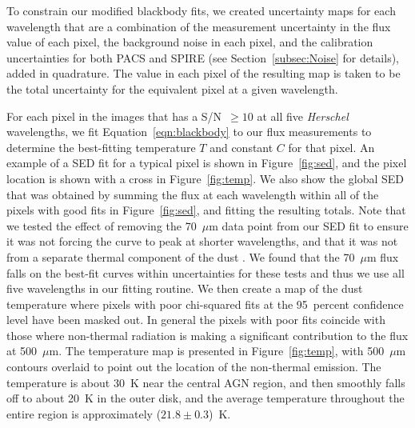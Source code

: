 \documentclass[useAMS,usenatbib,usegraphicx]{mn2e}
\begin{document}
To constrain our modified blackbody fits, we created uncertainty maps for each wavelength that are a combination of the measurement uncertainty in the flux value of each pixel, the background noise in each pixel, and the calibration uncertainties for both PACS and SPIRE (see Section~\ref{subsec:Noise} for details), added in quadrature.  The value in each pixel of the resulting map is taken to be the total uncertainty for the equivalent pixel at a given wavelength.

For each pixel in the images that has a S/N~$\ge 10$ at all five \emph{Herschel} wavelengths, we fit Equation~\ref{eqn:blackbody} to our flux measurements to determine the best-fitting temperature $T$ and constant $C$ for that pixel.  An example of a SED fit for a typical pixel is shown in Figure~\ref{fig:sed}, and the pixel location is shown with a cross in Figure~\ref{fig:temp}.  We also show the global SED that was obtained by summing the flux at each wavelength within all of the pixels with good fits in Figure~\ref{fig:sed}, and fitting the resulting totals.  Note that we tested the effect of removing the 70~$\mu$m data point from our SED fit to ensure it was not forcing the curve to peak at shorter wavelengths, and that it was not from a separate thermal component of the dust \citep{2010A&A...518L..51S, 2010A&A...518L..65B, Bendo_2011_submit}.  We found that the 70~$\mu$m flux falls on the best-fit curves within uncertainties for these tests and thus we use all five wavelengths in our fitting routine.  We then create a map of the dust temperature where pixels with poor chi-squared fits at the 95~percent confidence level have been masked out.  In general the pixels with poor fits coincide with those where non-thermal radiation is making a significant contribution to the flux at 500~$\mu$m. The temperature map is presented in Figure~\ref{fig:temp}, with 500~$\mu$m contours overlaid to point out the location of the non-thermal emission.  The temperature is about 30~K near the central AGN region, and then smoothly falls off to about 20~K in the outer disk, and the average temperature throughout the entire region is approximately ($21.8 \pm 0.3$)~K.
\end{document}
